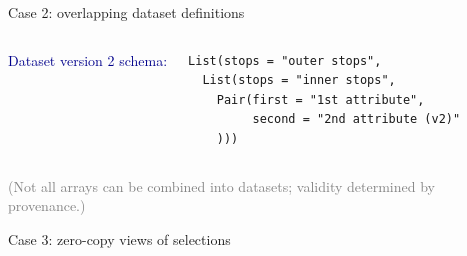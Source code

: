 \documentclass[aspectratio=169]{beamer}
\begin{document}
\begin{frame}[fragile]{Case 2: overlapping dataset definitions}
\begin{columns}[t]
\vspace{0.5 cm}
\textcolor{darkblue}{Dataset version 2 schema:}
{\scriptsize
\begin{verbatim}
List(stops = "outer stops",
  List(stops = "inner stops",
    Pair(first = "1st attribute",
         second = "2nd attribute (v2)"
    )))
\end{verbatim}}
\end{columns}

\vspace{-0.5 cm}
\textcolor{gray}{(Not all arrays can be combined into datasets; validity determined by provenance.)}
\end{frame}

\begin{frame}{Case 3: zero-copy views of selections}
\vspace{0.75 cm}


\end{frame}
\end{document}
